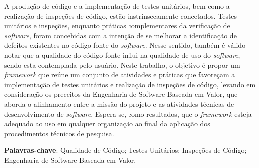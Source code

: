 \begin{resumo}
 
 A produção de código e a implementação de testes unitários, bem como a realização de inspeções de código, estão instrinsecamente concetados. Testes unitários e inspeções, enquanto práticas complementares da verificação de \textit{software}, foram concebidas com a intenção de se melhorar a identificação de defeitos existentes no código fonte do \textit{software}. Nesse sentido, também é válido notar que a qualidade do código fonte influi na qualidade de uso do \textit{software}, sendo esta contemplada pelo usuário. Neste trabalho, o objetivo é propor um \textit{framework} que reúne um conjunto de atividades e práticas que favoreçam a implementação de testes unitários e realização de inspeções de código, levando em consideração os preceitos da Engenharia de Software Baseada em Valor, que aborda o alinhamento entre a missão do projeto e as atividades técnicas de desenvolvimento de \textit{software}. Espera-se, como resultados, que o \textit{framework} esteja adequado ao uso em qualquer organização ao final da aplicação dos procedimentos técnicos de pesquisa.

 \vspace{\onelineskip}
    
 \noindent
 \textbf{Palavras-chave}: Qualidade de Código; Testes Unitários; Inspeções de Código; Engenharia de Software Baseada em Valor.
\end{resumo}
